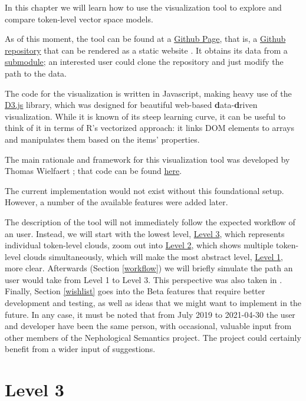 \documentclass[
]{book}
\begin{document}
In this chapter we will learn how to use the visualization tool to explore
and compare token-level vector space models.

As of this moment, the tool can be found at a
\href{https://qlvl.github.io/NephoVis}{Github Page}, that is,
a \href{https://github.com/qlvl/NephoVis}{Github repository} that can be rendered
as a static website \autocite{montes.qlvl_2021}.
It obtains its data from a \href{https://github.com/qlvl/tokenclouds}{submodule};
an interested user could clone the repository and just modify the path to the data.

The code for the visualization is written in Javascript, making heavy use of the
\href{https://d3.js}{D3.js} library, which was designed for beautiful web-based
\textbf{d}ata-\textbf{d}riven visualization. While it is known of its steep learning curve,
it can be useful to think of it in terms of R's vectorized approach: it links
DOM elements to arrays and manipulates them based on the items' properties.

The main rationale and framework for this visualization tool was developed by
Thomas Wielfaert \autocite{wielfaert.etal_2019}; that code can be found
\href{https://github.com/tokenclouds/tokenclouds.github.io/LeTok/}{here}.

The current implementation would not exist without this foundational setup. However,
a number of the available features were added later.

The description of the tool will not immediately follow the expected workflow of an user.
Instead, we will start with the lowest level, \protect\hyperlink{level_3}{Level 3},
which represents individual token-level clouds,
zoom out into \protect\hyperlink{level_2}{Level 2}, which shows multiple token-level clouds simultaneously,
which will make the most abstract level, \protect\hyperlink{level_1}{Level 1}, more clear.
Afterwards (Section \ref{workflow}) we will briefly simulate the path an user would take from Level 1 to Level 3.
This perspective was also taken in \textcite{montes.heylen_Submitted}.
Finally, Section \ref{wishlist} goes into the Beta features
that require better development and testing, as well as ideas that we might want to
implement in the future. In any case, it must be noted that from July 2019 to
2021-04-30 the user and developer have been the same person, with occasional,
valuable input from other members of the Nephological Semantics project. The
project could certainly benefit from a wider input of suggestions.

\hypertarget{level_3}{%
\section{Level 3}\label{level_3}}
\end{document}
